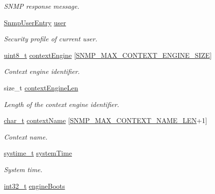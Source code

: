 \begin{DoxyCompactItemize}
\begin{DoxyCompactList}\small\item\em S\+N\+MP response message. \end{DoxyCompactList}\item 
\hyperlink{structSnmpUserEntry}{Snmp\+User\+Entry} \hyperlink{struct__SnmpAgentContext_ab31287db95db12b2bb010d2c0d33558f}{user}
\begin{DoxyCompactList}\small\item\em Security profile of current user. \end{DoxyCompactList}\item 
\hyperlink{stdint_8h_aba7bc1797add20fe3efdf37ced1182c5}{uint8\+\_\+t} \hyperlink{struct__SnmpAgentContext_ad423ff16166629f6a2b7a59dc3c0e861}{context\+Engine} \mbox{[}\hyperlink{snmp__common_8h_a182f7381f1e0c29ee196042008e380be}{S\+N\+M\+P\+\_\+\+M\+A\+X\+\_\+\+C\+O\+N\+T\+E\+X\+T\+\_\+\+E\+N\+G\+I\+N\+E\+\_\+\+S\+I\+ZE}\mbox{]}
\begin{DoxyCompactList}\small\item\em Context engine identifier. \end{DoxyCompactList}\item 
size\+\_\+t \hyperlink{struct__SnmpAgentContext_a2adf2a32f6ec673b0d2bb1db3294eb9d}{context\+Engine\+Len}
\begin{DoxyCompactList}\small\item\em Length of the context engine identifier. \end{DoxyCompactList}\item 
\hyperlink{compiler__port_8h_a40bb5262bf908c328fbcfbe5d29d0201}{char\+\_\+t} \hyperlink{struct__SnmpAgentContext_aaf917523cc2fe327770f073781f0d068}{context\+Name} \mbox{[}\hyperlink{snmp__common_8h_a59ce7ec8feba50f15272257094e14ac8}{S\+N\+M\+P\+\_\+\+M\+A\+X\+\_\+\+C\+O\+N\+T\+E\+X\+T\+\_\+\+N\+A\+M\+E\+\_\+\+L\+EN}+1\mbox{]}
\begin{DoxyCompactList}\small\item\em Context name. \end{DoxyCompactList}\item 
\hyperlink{compiler__port_8h_ae3e32a98d431a02106616da3071832dd}{systime\+\_\+t} \hyperlink{struct__SnmpAgentContext_adbf0654519314a1967b5134833edd25d}{system\+Time}
\begin{DoxyCompactList}\small\item\em System time. \end{DoxyCompactList}\item 
\hyperlink{stdint_8h_ab1967d8591af1a4e48c37fd2b0f184d0}{int32\+\_\+t} \hyperlink{struct__SnmpAgentContext_a4ffa75ed449e0230b556516bac93f4e1}{engine\+Boots}

\end{DoxyCompactItemize}
